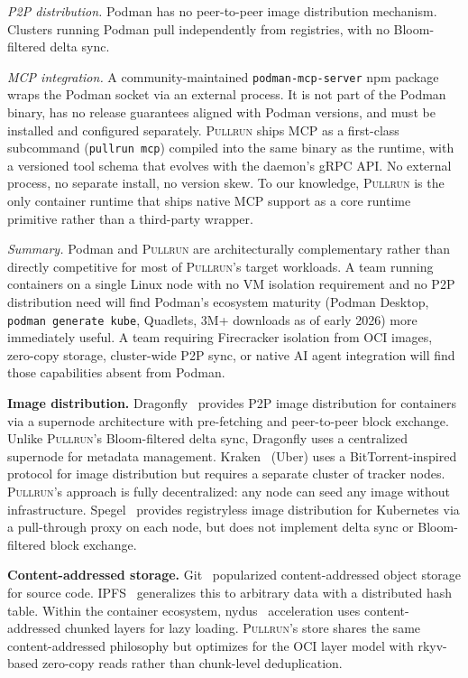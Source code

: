 \documentclass[11pt,a4paper]{article}
\newcommand{\pullrun}{\textsc{Pullrun}}
\begin{document}
\emph{P2P distribution.} Podman has no peer-to-peer image distribution mechanism. Clusters running Podman pull independently from registries, with no Bloom-filtered delta sync.

\emph{MCP integration.} A community-maintained \texttt{podman-mcp-server} npm package~\cite{podmancpmcp} wraps the Podman socket via an external process. It is not part of the Podman binary, has no release guarantees aligned with Podman versions, and must be installed and configured separately. \pullrun{} ships MCP as a first-class subcommand (\texttt{pullrun mcp}) compiled into the same binary as the runtime, with a versioned tool schema that evolves with the daemon's gRPC API. No external process, no separate install, no version skew. To our knowledge, \pullrun{} is the only container runtime that ships native MCP support as a core runtime primitive rather than a third-party wrapper.

\emph{Summary.} Podman and \pullrun{} are architecturally complementary rather than directly competitive for most of \pullrun{}'s target workloads. A team running containers on a single Linux node with no VM isolation requirement and no P2P distribution need will find Podman's ecosystem maturity (Podman Desktop, \texttt{podman generate kube}, Quadlets, 3M+ downloads as of early 2026) more immediately useful. A team requiring Firecracker isolation from OCI images, zero-copy storage, cluster-wide P2P sync, or native AI agent integration will find those capabilities absent from Podman.

\textbf{Image distribution.} Dragonfly~\cite{dragonfly} provides P2P image distribution for containers via a supernode architecture with pre-fetching and peer-to-peer block exchange. Unlike \pullrun{}'s Bloom-filtered delta sync, Dragonfly uses a centralized supernode for metadata management. Kraken~\cite{kraken} (Uber) uses a BitTorrent-inspired protocol for image distribution but requires a separate cluster of tracker nodes. \pullrun{}'s approach is fully decentralized: any node can seed any image without infrastructure. Spegel~\cite{spegel} provides registryless image distribution for Kubernetes via a pull-through proxy on each node, but does not implement delta sync or Bloom-filtered block exchange.

\textbf{Content-addressed storage.} Git~\cite{git} popularized content-addressed object storage for source code. IPFS~\cite{ipfs} generalizes this to arbitrary data with a distributed hash table. Within the container ecosystem, nydus~\cite{nydus} acceleration uses content-addressed chunked layers for lazy loading. \pullrun{}'s store shares the same content-addressed philosophy but optimizes for the OCI layer model with rkyv-based zero-copy reads rather than chunk-level deduplication.
\end{document}

